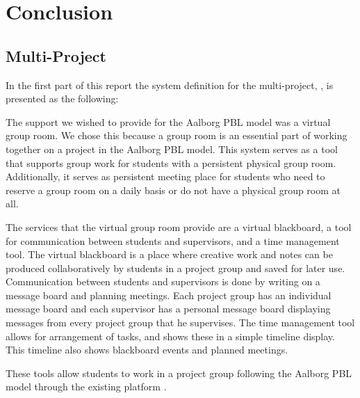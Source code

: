\chapter{Conclusion}
\label{chap:conclusion}
\section{Multi-Project}
\label{sec:multiconclusion}
In the first part of this report the system definition for the multi-project, \system{}, is presented as the following: 


The support we wished to provide for the Aalborg PBL model was a virtual group room.
We chose this because a group room is an essential part of working together on a project in the Aalborg PBL model. This system serves as a tool that supports group work for students with a persistent physical group room.
Additionally, it serves as persistent meeting place for students who need to reserve a group room on a daily basis or do not have a physical group room at all.

The services that the virtual group room provide are a virtual blackboard, a tool for communication between students and supervisors, and a time management tool.
The virtual blackboard is a place where creative work and notes can be produced collaboratively by students in a project group and saved for later use.
Communication between students and supervisors is done by writing on a message board and planning meetings.
Each project group has an individual message board and each supervisor has a personal message board displaying messages from every project group that he supervises.
The time management tool allows for arrangement of tasks, and shows these in a simple timeline display.
This timeline also shows blackboard events and planned meetings.

These tools allow students to work in a project group following the Aalborg PBL model through the existing platform \moodle{}.


